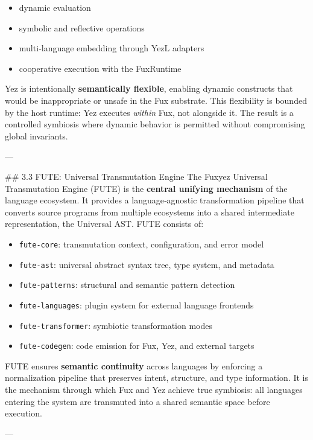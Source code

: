 \documentclass[12pt, a4paper]{book}
\begin{document}
\begin{itemize}
  \item dynamic evaluation  
  \item symbolic and reflective operations  
  \item multi‑language embedding through YezL adapters  
  \item cooperative execution with the FuxRuntime  
\end{itemize}

Yez is intentionally \textbf{semantically flexible}, enabling dynamic constructs that would be inappropriate or unsafe in the Fux substrate. This flexibility is bounded by the host runtime: Yez executes \textit{within} Fux, not alongside it. The result is a controlled symbiosis where dynamic behavior is permitted without compromising global invariants.

---

\#\# 3.3 FUTE: Universal Transmutation Engine  
The Fuxyez Universal Transmutation Engine (FUTE) is the \textbf{central unifying mechanism} of the language ecosystem. It provides a language‑agnostic transformation pipeline that converts source programs from multiple ecosystems into a shared intermediate representation, the Universal AST. FUTE consists of:

\begin{itemize}
  \item \texttt{fute-core}: transmutation context, configuration, and error model  
  \item \texttt{fute-ast}: universal abstract syntax tree, type system, and metadata  
  \item \texttt{fute-patterns}: structural and semantic pattern detection  
  \item \texttt{fute-languages}: plugin system for external language frontends  
  \item \texttt{fute-transformer}: symbiotic transformation modes  
  \item \texttt{fute-codegen}: code emission for Fux, Yez, and external targets  
\end{itemize}

FUTE ensures \textbf{semantic continuity} across languages by enforcing a normalization pipeline that preserves intent, structure, and type information. It is the mechanism through which Fux and Yez achieve true symbiosis: all languages entering the system are transmuted into a shared semantic space before execution.

---
\end{document}
